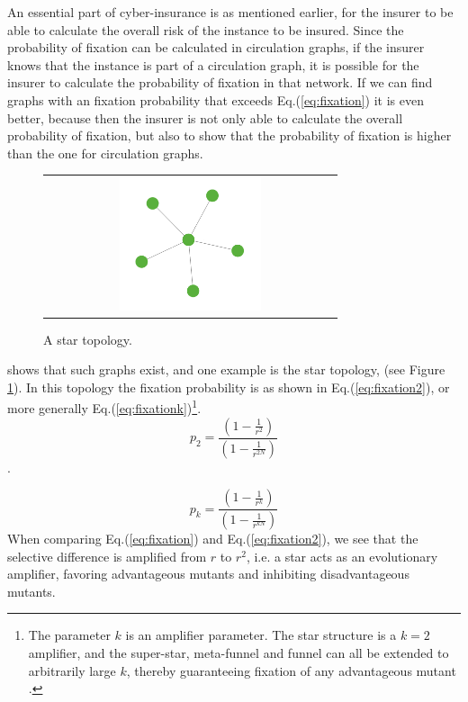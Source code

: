 An essential part of cyber-insurance is as mentioned earlier, for the insurer to be able to calculate the overall risk of the instance to be insured. Since the probability of fixation can be calculated in circulation graphs, if the insurer knows that the instance is part of a circulation graph, it is possible for the insurer to calculate the probability of fixation in that network. 
If we can find graphs with an fixation probability that exceeds Eq.(\ref{eq:fixation}) it is even better, because then the insurer is not only able to calculate the overall probability of fixation, but also to show that the probability of fixation is higher than the one for circulation graphs.
\begin{figure}[b]
\centering
\begin{tabular}{@{}c@{}}
\includegraphics[width=0.5\textwidth]{../Figures/aStar.png}
\end{tabular}
\caption[A start structure]{
\label{fig:star} A star topology. 
}
\end{figure}
\cite{lieberman2005evolutionary} shows that such graphs exist, and one example is the star topology, (see Figure \ref{fig:star}).
In this topology the fixation probability is as shown in Eq.(\ref{eq:fixation2}), or more generally Eq.(\ref{eq:fixationk})\footnote{The parameter $k$ is an amplifier parameter. The star structure is a $k=2$ amplifier, and the super-star, meta-funnel and funnel  can all be extended to arbitrarily large $k$, thereby guaranteeing fixation of any advantageous mutant \cite{lieberman2005evolutionary}.}. \begin{equation}p_{2}=\frac{(1-\frac{1}{r^{2}})}{(1-\frac{1}{r^{2N}})} \label{eq:fixation2} \end{equation}.

\begin{equation}
p_{k}=\frac{(1-\frac{1}{r^{k}})}{(1-\frac{1}{r^{kN}})} \label{eq:fixationk}
\end{equation}
 When comparing Eq.(\ref{eq:fixation}) and Eq.(\ref{eq:fixation2}), we see that the selective difference is
 amplified from $r$ to $r^{2}$, i.e. a star acts as an evolutionary amplifier, favoring advantageous
  mutants and inhibiting disadvantageous mutants.

